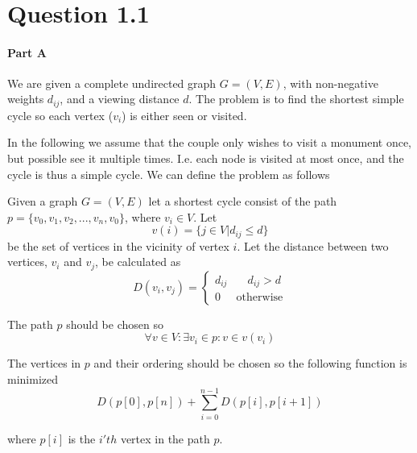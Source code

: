 \documentclass[10pt]{article}
\author{\authorName \\\texttt{\small{\authorEmail}}}
\title{\textsc{\titleName \\ \courseName}}
\begin{document}
\maketitle    

\section*{Question 1.1} %
\label{sec:question_1_1}
\paragraph{Part A} %
\label{par:part_a}

We are given a complete undirected graph $G = (V,E)$, with non-negative weights $d_{ij}$, and a viewing distance $d$. The problem is to find the shortest simple cycle so each vertex ($v_i$) is either seen or visited.

In the following we assume that the couple only wishes to visit a monument once, but possible see it multiple times. I.e. each node is visited at most once, and the cycle is thus a simple cycle. We can define the problem as follows

\begin{mydef}
Given a graph $G = (V, E)$ let a shortest cycle consist of the path $p = \{v_0, v_1,v_2,...,v_n, v_0\}$, where $v_i \in V$. Let 
\begin{equation}
  v(i) = \{j  \in V | d_{ij} \leq d\}
\end{equation}
be the set of vertices in the vicinity of vertex $i$. Let the distance between two vertices, $v_i$ and $v_j$, be calculated as
\begin{equation} 
D(v_i,v_j) = 
\begin{cases}
 d_{ij} &  \quad d_{ij}>d \\
 0      &  \text{otherwise}
\end{cases} 
\end{equation} 

The path $p$ should be chosen so 
\begin{equation}
  \forall v \in V : \exists v_i \in p : v \in v(v_i) 
\end{equation}        

The vertices in $p$ and their ordering should be chosen so the following function is minimized
\begin{equation}
  D(p[0],p[n])+\sum_{i=0}^{n-1} D(p[i],p[i+1])
\end{equation}

where $p[i]$ is the $i'th$ vertex in the path $p$.
\label{def1}
\end{mydef}
\end{document}

